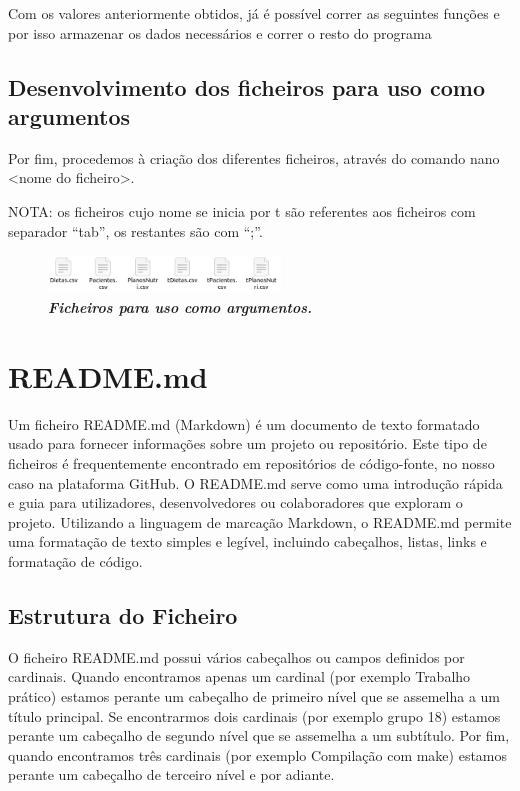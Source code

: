 \documentclass[a4wide]{report}
\begin{document}
{{{{Com os valores anteriormente obtidos, já é possível correr as seguintes funções e por isso armazenar os dados necessários e correr o resto do programa 

\section{Desenvolvimento dos ficheiros para uso como argumentos}
\Large
Por fim, procedemos à criação dos diferentes ficheiros, através do comando nano <nome do ficheiro>. 

NOTA: os ficheiros cujo nome se inicia por t são referentes aos ficheiros com separador “tab”, os restantes são com “;”. 

\begin{figure}[hbt]
    \centering
    \includegraphics[width=0.55\textwidth]{ficheiroscsv.png}
    \caption{\textbf{\textit{Ficheiros para uso como argumentos.}}\label{fig:imagem}}
\end{figure}

\newpage
\chapter{README.md}
\Large
Um ficheiro README.md (Markdown) é um documento de texto formatado usado para fornecer informações sobre um projeto ou repositório. Este tipo de ficheiros é frequentemente encontrado em repositórios de código-fonte, no nosso caso na plataforma GitHub. O README.md serve como uma introdução rápida e guia para utilizadores, desenvolvedores ou colaboradores que exploram o projeto. Utilizando a linguagem de marcação Markdown, o README.md permite uma formatação de texto simples e legível, incluindo cabeçalhos, listas, links e formatação de código.

\section{Estrutura do Ficheiro}
\Large
O ficheiro README.md possui vários cabeçalhos ou campos definidos por cardinais. Quando encontramos apenas um cardinal (por exemplo Trabalho prático) estamos perante um cabeçalho de primeiro nível que se assemelha a um título principal. Se encontrarmos dois cardinais (por exemplo grupo 18) estamos perante um cabeçalho de segundo nível que se assemelha a um subtítulo. Por fim, quando encontramos três cardinais (por exemplo Compilação com make) estamos perante um cabeçalho de terceiro nível e por adiante. 

}}}}
\end{document}

